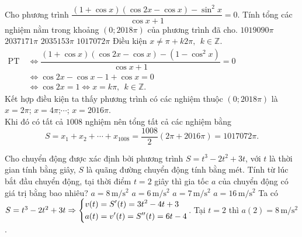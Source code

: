 \begin{ex}%
	Cho phương trình $\dfrac{(1+\cos x)(\cos 2x-\cos x)-\sin^2 x}{\cos x+1}=0$. Tính tổng các nghiệm nằm trong khoảng $(0;2018\pi)$ của phương trình đã cho.
	\choice
	{$1019090\pi $}
	{$2037171\pi $}
	{$2035153\pi $}
	{\True $1017072\pi $}
	\loigiai
	{Điều kiện $x\ne \pi +k2\pi,\ \ k\in \mathbb{Z}$.\\
		$\begin{aligned}
		\text{PT}\ &\Leftrightarrow \dfrac{\left({1+\cos x}\right)\left({\cos 2x-\cos x}\right)-\left({1-{\cos}^2x}\right)}{\cos x+1}=0\\
		&\Leftrightarrow \cos 2x-\cos x-1+\cos x=0\\
		&\Leftrightarrow \cos 2x=1\Leftrightarrow x=k\pi,\ \ k\in \mathbb{Z}.
		\end{aligned}$ \\
		Kết hợp điều kiện ta thấy phương trình có các nghiệm thuộc $\left({0;2018\pi}\right)$ là $x=2\pi$; $x=4\pi$;$\cdots$;  $x=2016\pi$.\\
		Khi đó có tất cả $1008$ nghiệm nên tổng tất cả các nghiệm bằng $$S=x_1+x_2+\cdots+x_{1008}=\dfrac{1008}{2}\left({2\pi +2016\pi}\right)=1017072\pi .$$}
\end{ex}
\begin{ex}%
	Cho chuyển động được xác định bởi phương trình $S=t^3-2t^2+3t$, với $t$ là thời gian tính bằng giây, $S$ là quãng đường chuyển động tính bằng mét. Tính từ lúc bắt đầu chuyển động, tại thời điểm $t=2$ giây thì gia tốc $a$ của chuyển động có giá trị bằng bao nhiêu?
	\choice
	{\True $a=8 \mathrm{\, m/s^2}$}
	{$a=6\mathrm{\, m/s^2}$}
	{$a=7\mathrm{\, m/s^2}$}
	{$a=16\mathrm{\, m/s^2}$}
	\loigiai
	{Ta có $S=t^3-2t^2+3t\Rightarrow \left\{\begin{aligned}&v(t)=S'(t)=3t^2-4t+3\\&a(t)=v'(t)=S''(t)=6t-4\end{aligned}\right.$. Tại $t=2$ thì $a(2)=8\mathrm{\, m/s^2}$.}
\end{ex}
